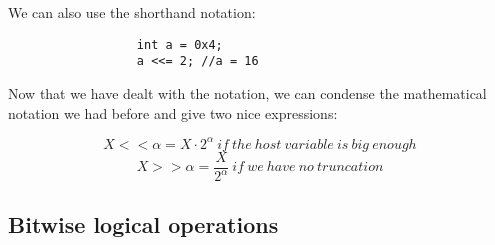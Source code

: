 \documentclass[12pt]{book}
\begin{document}
                We can also use the shorthand notation:

                \begin{verbatim}
                  int a = 0x4;
                  a <<= 2; //a = 16
                \end{verbatim}

                Now that we have dealt with the notation, we can condense the mathematical notation we had before and give two nice expressions:

                $$X << \alpha = X \cdot 2^{\alpha}\ if\ the\ host\ variable\ is\ big\ enough$$
                $$X >> \alpha = \frac{X}{2^\alpha}\ if\ we\ have\ no\ truncation$$

              \subsection{Bitwise logical operations}
\end{document}
